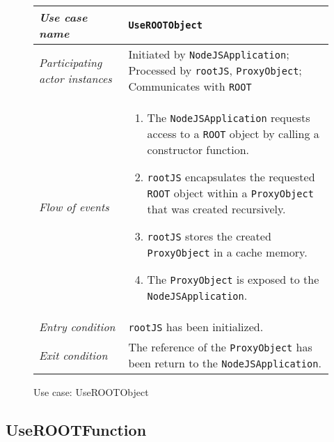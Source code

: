 \begin{figure}[htb]
	\centering
	\begin{longtable}{p{3cm} @{\hskip 1cm} p{12cm}}
		\hline

		\textit{Use case name} & \texttt{UseROOTObject}\\
		\hline

		\textit{Participating actor instances} &
		Initiated by \texttt{NodeJSApplication}; Processed by \texttt{rootJS}, \texttt{ProxyObject}; Communicates with \texttt{ROOT}\\
		\hline

		\textit{Flow of events} &
			\begin{enumerate}
				\item The \texttt{NodeJSApplication} requests access to a \texttt{ROOT} object by calling a constructor function.
				\item \texttt{rootJS} encapsulates the requested \texttt{ROOT} object within a \texttt{ProxyObject} that was created recursively.
				\item \texttt{rootJS} stores the created \texttt{ProxyObject} in a cache memory.
				\item The \texttt{ProxyObject} is exposed to the \texttt{NodeJSApplication}.
			\end{enumerate}
			\\
		\hline

		\textit{Entry condition} & \texttt{rootJS} has been initialized.\\
		\hline

		\textit{Exit condition} & The reference of the \texttt{ProxyObject} has been return to the \texttt{NodeJSApplication}.\\
        \hline
	\end{longtable}

	\caption{Use case: UseROOTObject}
\end{figure}

\pagebreak

\subsection{UseROOTFunction}

